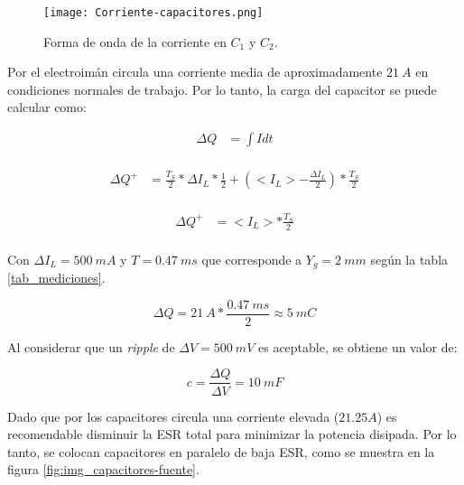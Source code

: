 \begin{figure}[H]
	\centering
	\texttt{[image: Corriente-capacitores.png]}
	\caption{Forma de onda de la corriente en $C_1$ y $C_2$.}
	\label{fig:img_ccorriente-capacitores}
\end{figure}

\noindent Por el electroimán circula una corriente media de aproximadamente $21\:A$ en condiciones normales de trabajo. Por lo tanto, la carga del capacitor se puede calcular como:

\begin{equation} 
	\begin{aligned}
		\Delta Q &= \int I dt\\	
	\end{aligned}
\end{equation}

\begin{equation} 
	\begin{aligned}
		\Delta Q ^+ &= \frac{T_S}{2}*\Delta I_L * \frac{1}{2} + (<I_L> -\frac{\Delta I_L}{2})*\frac{T_S}{2}\\
	\end{aligned}
\end{equation}

\begin{equation} 
	\begin{aligned}
		\Delta Q ^+ &= <I_L> *\frac{T_S}{2}\\
	\end{aligned}
\end{equation}

\noindent Con $\Delta I_L=500 \:mA$ y $T=0.47\:ms$ que corresponde a $Y_g = 2 \:mm$ según la tabla \ref{tab_mediciones}.

\begin{equation} 
	\Delta Q = 21\:A * \frac{0.47\:ms}{2} \approx 5\:mC
\end{equation}

\noindent Al considerar que un \textsl{ripple} de $\Delta V=500 \:mV$ es aceptable, se obtiene un valor de:

\begin{equation} 
	c = \frac{\Delta Q}{\Delta V} = 10 \:mF
\end{equation}

\noindent Dado que por los capacitores circula una corriente elevada ($21.25 A$) es recomendable disminuir la ESR total para minimizar la potencia disipada. Por lo tanto, se colocan capacitores en paralelo de baja ESR, como se muestra en la figura \ref{fig:img_capacitores-fuente}.

